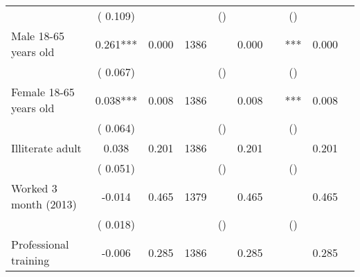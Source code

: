 \begin{tabular}{l*{9}{c}}
                               &        (       0.109) & &                                                                 &       () & &                                                          &       () & &                                          \\ 
 Male 18-65 years old                 &              0.261***          &        0.000 & 1386          &        &        0.000 &                    & *** &        0.000 &                                  \\ 
                               &        (       0.067) & &                                                                 &       () & &                                                          &       () & &                                          \\ 
 Female 18-65 years old                 &              0.038***          &        0.008 & 1386          &        &        0.008 &                    & *** &        0.008 &                                  \\ 
                               &        (       0.064) & &                                                                 &       () & &                                                          &       () & &                                          \\ 
 Illiterate adult                 &              0.038          &        0.201 & 1386          &        &        0.201 &                    &  &        0.201 &                                  \\ 
                               &        (       0.051) & &                                                                 &       () & &                                                          &       () & &                                          \\ 
 Worked 3 month (2013)                 &             -0.014          &        0.465 & 1379          &        &        0.465 &                    &  &        0.465 &                                  \\ 
                               &        (       0.018) & &                                                                 &       () & &                                                          &       () & &                                          \\ 
 Professional training                        &             -0.006                &        0.285 & 1386                &        &        0.285 &                        &  &        0.285 &                              \\ 

\end{tabular}
